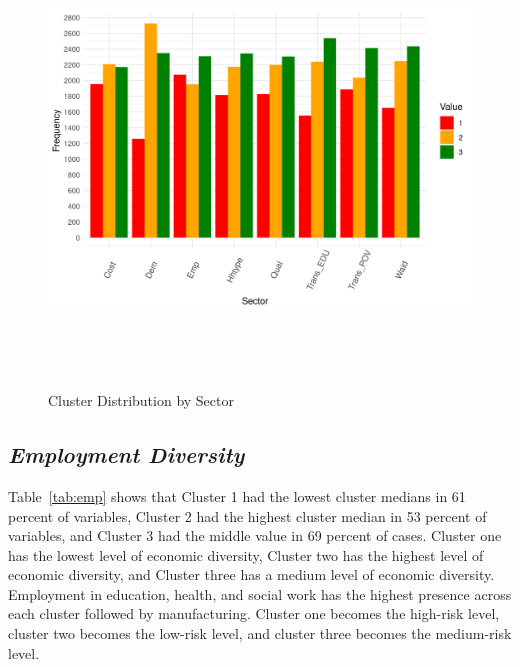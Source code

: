 \begin{figure}[htbp]
    \centering
     \includegraphics[width=1\textwidth, height=12cm]{plots/cluster_distribution.png}
     \caption{Cluster Distribution by Sector}
     \label{fig:cluster_dis}
 \end{figure}


 
\subsection{\textit{Employment Diversity}}

Table~\ref{tab:emp} shows that Cluster 1 had the lowest cluster medians in 61 percent of variables, Cluster 2 had the highest cluster median in 53 percent of variables, and Cluster 3 had the middle value in 69 %
percent of cases. Cluster one has the lowest level of economic diversity, Cluster two has the highest level of economic diversity, and Cluster three has a medium level of economic diversity. Employment in education, health, and social work has the highest presence across each cluster followed by manufacturing. Cluster one becomes the high-risk level, cluster two becomes the low-risk level, and cluster three becomes the medium-risk level.

